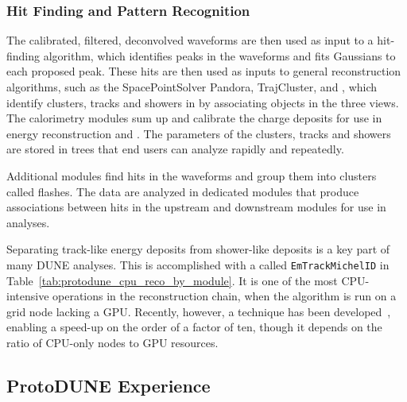 \documentclass[../main-v1.tex]{subfiles}
\begin{document}
\subsubsection{Hit Finding and Pattern Recognition}

The calibrated, filtered, deconvolved waveforms are then used as input to a hit-finding algorithm, which identifies peaks in the waveforms and fits Gaussians to each proposed peak.  These hits are then used as inputs to general reconstruction algorithms, such as the SpacePointSolver Pandora, TrajCluster, and , which identify clusters, tracks and showers in \threed by associating objects in the three \twod views.  The calorimetry modules sum up and calibrate the charge deposits for use in energy reconstruction and .  The parameters of the clusters, tracks and showers are stored in  trees that end users can analyze rapidly and repeatedly.

Additional modules find hits in the  waveforms and group them into clusters called flashes.  The  data are analyzed in dedicated modules that produce associations between hits in the upstream and downstream  modules for use in analyses.

Separating track-like energy deposits from shower-like deposits is a key part of many DUNE analyses.  This is accomplished with a  called {\tt EmTrackMichelID} in Table~\ref{tab:protodune_cpu_reco_by_module}.  It is one of the most CPU-intensive operations in the  reconstruction chain, when the algorithm is run on a grid node lacking a GPU.  Recently, however, a  technique has been developed~\cite{Wang:2020fjr}, enabling a speed-up on the order of a factor of ten, though it depends on the ratio of CPU-only nodes to GPU resources.

\subsection{ProtoDUNE Experience}
\end{document}
